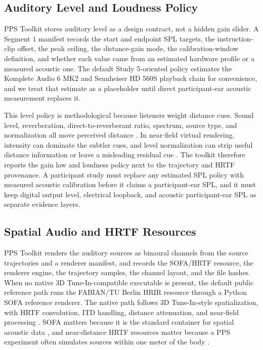 \documentclass[pdflatex,sn-apa]{sn-jnl}
\newcommand{\toolkit}{PPS Toolkit}
\begin{document}
\subsection{Auditory Level and Loudness Policy}

\toolkit{} stores auditory level as a design contract, not a hidden gain slider. A Segment 1 manifest records the start and endpoint SPL targets, the instruction-clip offset, the peak ceiling, the distance-gain mode, the calibration-window definition, and whether each value came from an estimated hardware profile or a measured acoustic one. The default Study 5-oriented policy estimates the Komplete Audio 6 MK2 and Sennheiser HD 560S playback chain for convenience, and we treat that estimate as a placeholder until direct participant-ear acoustic measurement replaces it.

This level policy is methodological because listeners weight distance cues. Sound level, reverberation, direct-to-reverberant ratio, spectrum, source type, and normalization all move perceived distance \citep{Zahorik2002,Kolarik2015}. In near-field virtual rendering, intensity can dominate the subtler cues, and level normalization can strip useful distance information or leave a misleading residual cue \citep{Spagnol2017,Arend2021Level}. The toolkit therefore reports the gain law and loudness policy next to the trajectory and HRTF provenance. A participant study must replace any estimated SPL policy with measured acoustic calibration before it claims a participant-ear SPL, and it must keep digital output level, electrical loopback, and acoustic participant-ear SPL as separate evidence layers.

\subsection{Spatial Audio and HRTF Resources}

\toolkit{} renders the auditory sources as binaural channels from the source trajectories and a renderer manifest, and records the SOFA/HRTF resource, the renderer engine, the trajectory samples, the channel layout, and the file hashes. When no native 3D Tune-In-compatible executable is present, the default public reference path runs the FABIAN/TU Berlin HRIR resource through a Python SOFA reference renderer. The native path follows 3D Tune-In-style spatialization, with HRTF convolution, ITD handling, distance attenuation, and near-field processing \citep{CuevasRodriguez2019}. SOFA matters because it is the standard container for spatial acoustic data \citep{AES69}, and near-distance HRTF resources matter because a PPS experiment often simulates sources within one meter of the body \citep{Salvador2018}.
\end{document}
